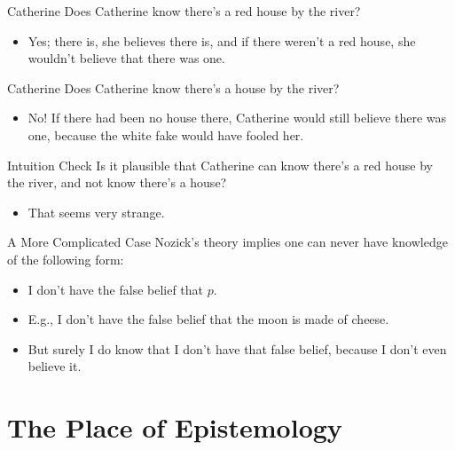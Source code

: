 \documentclass[
  17pt,
  letterpaper,
  ignorenonframetext,
  aspectratio=169,
  handout]{beamer}
\providecommand{\tightlist}{%
  \setlength{\itemsep}{0pt}\setlength{\parskip}{0pt}}\usepackage{longtable,booktabs,array}
\begin{document}
\begin{frame}{Catherine}
\protect\hypertarget{catherine}{}
Does Catherine know there's a red house by the river?

\begin{itemize}[<+->]
\tightlist
\item
  Yes; there is, she believes there is, and if there weren't a red
  house, she wouldn't believe that there was one.
\end{itemize}
\end{frame}

\begin{frame}{Catherine}
\protect\hypertarget{catherine-1}{}
Does Catherine know there's a house by the river?

\begin{itemize}[<+->]
\tightlist
\item
  No! If there had been no house there, Catherine would still believe
  there was one, because the white fake would have fooled her.
\end{itemize}
\end{frame}

\begin{frame}{Intuition Check}
\protect\hypertarget{intuition-check}{}
Is it plausible that Catherine can know there's a red house by the
river, and not know there's a house?

\begin{itemize}[<+->]
\tightlist
\item
  That seems very strange.
\end{itemize}
\end{frame}

\begin{frame}{A More Complicated Case}
\protect\hypertarget{a-more-complicated-case}{}
Nozick's theory implies one can never have knowledge of the following
form:

\begin{itemize}[<+->]
\tightlist
\item
  I don't have the false belief that \(p\).
\item
  E.g., I don't have the false belief that the moon is made of cheese.
\item
  But surely I do know that I don't have that false belief, because I
  don't even believe it.
\end{itemize}
\end{frame}

\hypertarget{the-place-of-epistemology}{%
\section{The Place of Epistemology}\label{the-place-of-epistemology}}
\end{document}
